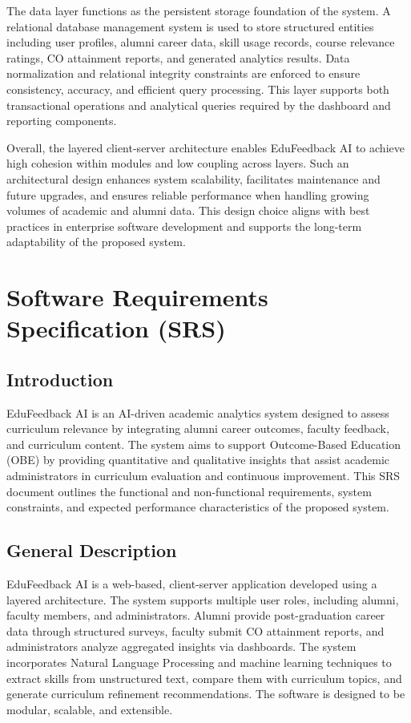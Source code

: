 The data layer functions as the persistent storage foundation of the system. A relational database management system is used to store structured entities including user profiles, alumni career data, skill usage records, course relevance ratings, CO attainment reports, and generated analytics results. Data normalization and relational integrity constraints are enforced to ensure consistency, accuracy, and efficient query processing. This layer supports both transactional operations and analytical queries required by the dashboard and reporting components.

Overall, the layered client-server architecture enables EduFeedback AI to achieve high cohesion within modules and low coupling across layers. Such an architectural design enhances system scalability, facilitates maintenance and future upgrades, and ensures reliable performance when handling growing volumes of academic and alumni data. This design choice aligns with best practices in enterprise software development and supports the long-term adaptability of the proposed system.

\section{Software Requirements Specification (SRS)}

\subsection{Introduction}
EduFeedback AI is an AI-driven academic analytics system designed to assess curriculum relevance by integrating alumni career outcomes, faculty feedback, and curriculum content. The system aims to support Outcome-Based Education (OBE) by providing quantitative and qualitative insights that assist academic administrators in curriculum evaluation and continuous improvement. This SRS document outlines the functional and non-functional requirements, system constraints, and expected performance characteristics of the proposed system.

\subsection{General Description}
EduFeedback AI is a web-based, client-server application developed using a layered architecture. The system supports multiple user roles, including alumni, faculty members, and administrators. Alumni provide post-graduation career data through structured surveys, faculty submit CO attainment reports, and administrators analyze aggregated insights via dashboards. The system incorporates Natural Language Processing and machine learning techniques to extract skills from unstructured text, compare them with curriculum topics, and generate curriculum refinement recommendations. The software is designed to be modular, scalable, and extensible.

